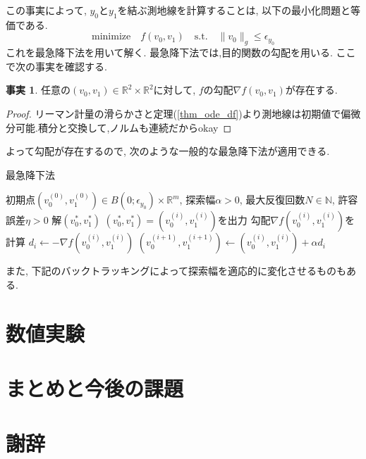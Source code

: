\documentclass[uplatex]{suribt}
\theoremstyle{definition}
\newtheorem{fact}[theorem]{事実}
\begin{document}
\noindent
この事実によって, \(y_0\)と\(y_1\)を結ぶ測地線を計算することは, 以下の最小化問題と等価である.
\begin{equation*}
\text{minimize} \quad f(v_0,v_1) \quad \text{s.t.} \quad \|v_0\|_g \le \epsilon_{y_0}   
\end{equation*}
これを最急降下法を用いて解く. 最急降下法では,目的関数の勾配を用いる. ここで次の事実を確認する.
\begin{fact}
任意の\((v_0,v_1) \in \mathbb{R}^2 \times \mathbb{R}^2\)に対して, \(f\)の勾配\(\nabla f(v_0,v_1)\)が存在する.
\end{fact}
\begin{proof}
リーマン計量の滑らかさと定理(\ref{thm_ode_df})より測地線は初期値で偏微分可能.積分と交換して,ノルムも連続だからokay
\end{proof}
\noindent
よって勾配が存在するので, 次のような一般的な最急降下法が適用できる.
\begin{algorithm}
    \caption{最急降下法}
    \begin{algorithmic}[1]
    \REQUIRE 初期点\((v_0^{(0)},v_1^{(0)}) \in B(0;\epsilon_{y_0}) \times \mathbb{R}^m\), 探索幅\(\alpha > 0\), 最大反復回数\(N \in \mathbb{N}\), 許容誤差\(\eta > 0\)
    \ENSURE 解\((v_{0}^*,v_{1}^*)\)
    \STATE \((v_{0}^*,v_{1}^*)=(v_0^{(i)},v_1^{(i)})\)を出力
    \ENDIF
    \STATE 勾配\(\nabla f(v_0^{(i)},v_1^{(i)})\)を計算
    \STATE \(d_i \leftarrow -\nabla f(v_0^{(i)},v_1^{(i)})\)
    \STATE \((v_0^{(i+1)},v_1^{(i+1)}) \leftarrow (v_0^{(i)},v_1^{(i)}) + \alpha d_i\)
    \ENDFOR
    \end{algorithmic}
\end{algorithm}
また, 下記のバックトラッキングによって探索幅を適応的に変化させるものもある. 

\chapter{数値実験}

\chapter{まとめと今後の課題}
\backmatter%
\chapter{謝辞}%


\appendix%
\chapter{}
\end{document}
